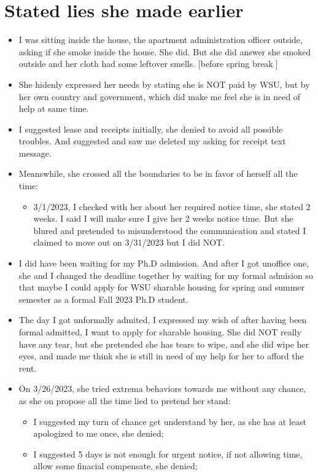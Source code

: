 \documentclass[9pt, b5paper]{article}
\begin{document}
\section{Stated lies she made earlier}
\label{sec-10}
\begin{itemize}
\item I was sitting inside the house, the apartment administration officer outside, asking if she smoke inside the house. She did. But she did answer she smoked outside and her cloth had some leftover smells. [before spring break]
\item She hidenly expressed her needs by stating she is NOT paid by WSU, but by her own country and government, which did make me feel she is in need of help at same time.
\item I suggested lease and receipts initially, she denied to avoid all possible troubles. And suggested and saw me deleted my asking for receipt text message.
\item Meanswhile, she crossed all the boundaries to be in favor of herself all the time: 
\begin{itemize}
\item 3/1/2023, I checked with her about her required notice time, she stated 2 weeks. I said I will make sure I give her 2 weeks notice time. But she blured and pretended to misunderstood the communication and stated I claimed to move out on 3/31/2023 but I did NOT.
\end{itemize}
\item I did have been waiting for my Ph.D admission. And after I got unoffice one, she and I changed the deadline together by waiting for my formal admision so that maybe I could apply for WSU sharable housing for spring and summer semester as a formal Fall 2023 Ph.D student.
\item The day I got unformally admited, I expressed my wish of after having been formal admitted, I want to apply for sharable housing. She did NOT really have any tear, but she pretended she has tears to wipe, and she did wipe her eyes, and made me think she is still in need of my help for her to afford the rent.
\item On 3/26/2023, she tried extrema behaviors towards me without any chance, as she on propose all the time lied to pretend her stand:
\begin{itemize}
\item I suggested my turn of chance get understand by her, as she has at least apologized to me once, she denied;
\item I suggested 5 days is not enough for urgent notice, if not allowing time, allow some finacial compensate, she denied;

\end{itemize}
\end{itemize}
\end{document}
